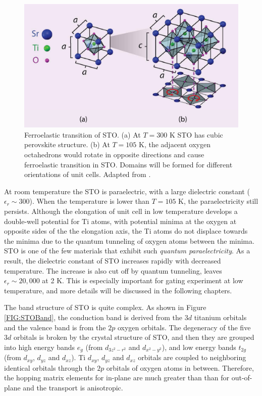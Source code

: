 \documentclass[pdflatex, sectionletters, 12pt]{pittetd}    %
\begin{document}
\begin{figure}[h!]
	\centering
	\includegraphics[width=.80\textwidth]{Drawing/STOPhaseTransition.pdf}
	\caption{Ferroelastic transition of STO. (a) At $T=300$ K STO has cubic perovskite structure. (b) At $T = 105$ K, the adjacent oxygen octahedrons would rotate in opposite directions and cause ferroelastic transition in STO. Domains will be formed for different orientations of unit cells. Adapted from \cite{sulpizio2014nanoscale}.}
	\label{FIG:STOPhaseTransition}
\end{figure}

At room temperature the STO is paraelectric, with a large dielectric constant ($\epsilon_r \sim 300$).  When the temperature is lower than $T=105$ K, the paraelectricity still persists. Although the elongation of unit cell in low temperature develops a double-well potential for Ti atoms, with potential minima at the oxygen at opposite sides of the the elongation axis, the Ti atoms do not displace towards the minima due to the quantum tunneling of oxygen atoms\cite{sulpizio2014nanoscale} between the minima. STO is one of the few materials that exhibit such \emph{quantum paraelectricity}\cite{muller1979srti}. As a result, the dielectric constant of STO increases rapidly with decreased temperature. The increase is also cut off by quantum tunneling, leaves $\epsilon_r \sim 20,000$\cite{sakudo1971dielectric} at 2 K. This is especially important for gating experiment at low temperature, and more details will be discussed in the following chapters.

The band structure of STO is quite complex. As shown in Figure \ref{FIG:STOBand}, the conduction band is derived from the $3d$ titanium orbitals and the valence band is from the $2p$ oxygen orbitals. The degeneracy of the five $3d$ orbitals is broken by the crystal structure of STO, and then they are grouped into high energy bands $e_g$ (from $d_{3z^2 - r^2}$ and $d_{x^2-y^2}$), and low energy bands $t_{2g}$ (from $d_{xy}$, $d_{yz}$ and $d_{xz}$). Ti $d_{xy}$, $d_{yz}$ and $d_{xz}$ orbitals are coupled to neighboring identical orbitals through the $2p$ orbitals of oxygen atoms in between. Therefore, the hopping matrix elements for in-plane are much greater than than for out-of-plane and the transport is anisotropic\cite{sulpizio2014nanoscale}. 
\end{document}

